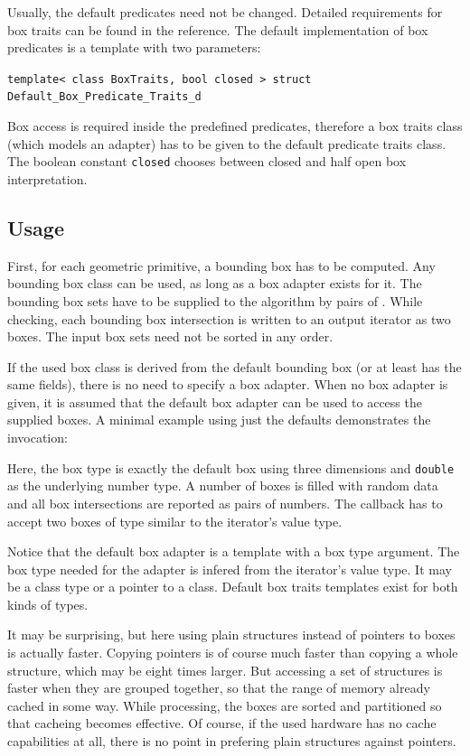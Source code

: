 Usually, the default predicates need not be changed. Detailed requirements for box traits can be found in the reference. The default implementation of box predicates is a template with two parameters:

\texttt{template< class BoxTraits, bool closed > struct Default\_Box\_Predicate\_Traits\_d}

Box access is required inside the predefined predicates, therefore a box traits class (which models an adapter) has to be given to the default predicate traits class. The boolean constant \texttt{closed} chooses between closed and half open box interpretation.


\subsection*{Usage}
First, for each geometric primitive, a bounding box has to be computed. Any bounding box class can be used, as long as a box adapter exists for it. The bounding box sets have to be supplied to the algorithm by pairs of . While checking, each bounding box intersection is written to an output iterator as two boxes. The input box sets need not be sorted in any order.

If the used box class is derived from the default bounding box (or at least has the same fields), there is no need to specify a box adapter. When no box adapter is given, it is assumed that the default box adapter can be used to access the supplied boxes. A minimal example using just the defaults demonstrates the invocation:


Here, the box type is exactly the default box using three dimensions and \texttt{double} as the underlying number type. A number of boxes is filled with random data and all box intersections are reported as pairs of numbers. The callback has to accept two boxes of type similar to the iterator's value type.

Notice that the default box adapter is a template with a box type argument. The box type needed for the adapter is infered from the iterator's value type. It may be a class type or a pointer to a class. Default box traits templates exist for both kinds of types.

It may be surprising, but here using plain structures instead of pointers to boxes is actually faster. Copying pointers is of course much faster than copying a whole structure, which may be eight times larger. But accessing a set of structures is faster when they are grouped together, so that the range of memory already cached in some way. While processing, the boxes are sorted and partitioned so that cacheing becomes effective. Of course, if the used hardware has no cache capabilities at all, there is no point in prefering plain structures against pointers.

